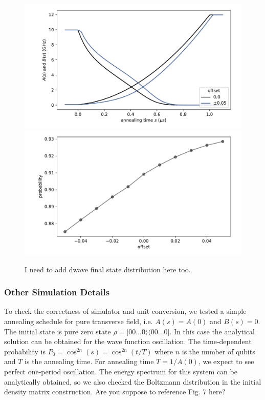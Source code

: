 \documentclass[prd,twocolumn,tightenlines,preprintnumbers,showpacs,superscriptaddress,notitlepage,nofootinbib,eqsecnum,floatfix,longbibliography,aps,10pt]{revtex4-2}
\begin{document}
\begin{figure}
	\centering
	\includegraphics[width=\columnwidth]{./new_figures/anneal_schedule_extended.pdf}
	\includegraphics[width=\columnwidth]{./new_figures/NN2_offset_scaling_extended.pdf}
	\caption{{\color{red}I need to add dwave final state distribution here too.}}
	\label{fig:anneal_schedule_ext}
\end{figure}

\subsubsection{Other Simulation Details}
\label{sec:methods:simulation_details}
To check the correctness of simulator and unit conversion, we tested a simple annealing schedule for pure transverse field, i.e. $A(s)=A(0)$ and $B(s)=0$.
The initial state is pure zero state $\rho=|00...0\rangle \langle 00...0|$.
In this case the analytical solution can be obtained for the wave function oscillation.
The time-dependent probability is $P_{0}=\cos^{2n}(s)=\cos^{2n}(t/T)$ where $n$ is the number of qubits and $T$ is the annealing time.
For annealing time $T=1/A(0)$, we expect to see perfect one-period oscillation. The energy spectrum for this system can be analytically obtained, so we also checked the Boltzmann distribution in the initial density matrix construction.
{\color{red} Are you suppose to reference Fig. 7 here?}
\end{document}
